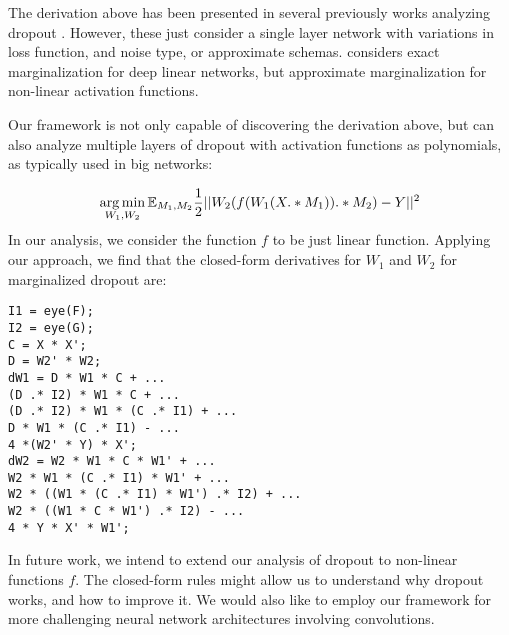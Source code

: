 
The derivation above has been presented in several previously works
analyzing dropout \cite{chen2013learning, chen2012marginalized, maaten2013learning}. 
However, these just consider a single layer network with variations in loss function, and noise type, 
or approximate schemas. \cite{baldi2014dropout} considers exact marginalization 
for deep linear networks, but approximate marginalization for non-linear activation functions.


Our framework is not only capable of discovering the derivation above,
but can also analyze multiple layers of dropout with activation functions as polynomials, 
as typically used in big networks:



 


\begin{equation*}
  \operatorname*{arg\,min}_{W_1, W_2} \mathbb{E}_{M_1, M_2} \frac{1}{2}||W_2(f(W_1(X .* M_1)) .* M_2) - Y||^2
\end{equation*}
In our analysis, we consider the function $f$ to be just linear 
function.  Applying our approach, we find that the closed-form derivatives for $W_1$ and $W_2$ for marginalized 
dropout are:
\begin{lstlisting}
I1 = eye(F);
I2 = eye(G);
C = X * X';
D = W2' * W2;
dW1 = D * W1 * C + ...
(D .* I2) * W1 * C + ...
(D .* I2) * W1 * (C .* I1) + ...
D * W1 * (C .* I1) - ...
4 *(W2' * Y) * X'; 
dW2 = W2 * W1 * C * W1' + ...
W2 * W1 * (C .* I1) * W1' + ...
W2 * ((W1 * (C .* I1) * W1') .* I2) + ...
W2 * ((W1 * C * W1') .* I2) - ...
4 * Y * X' * W1';
\end{lstlisting}

In future work, we intend to extend our analysis of dropout to
non-linear functions $f$. The closed-form rules might
allow us to understand why dropout works, and how to improve it. We
would also like to  employ our framework for more challenging neural network architectures involving
convolutions.

